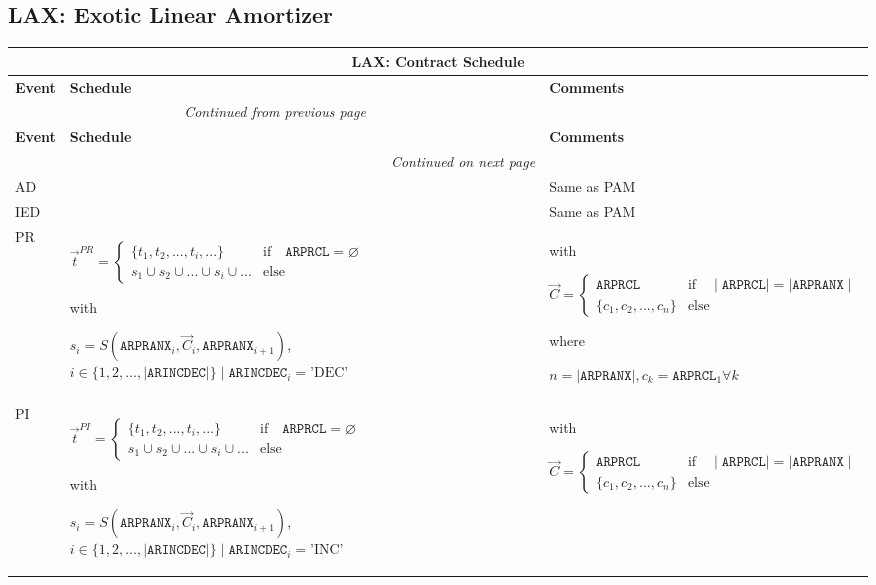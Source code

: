 \documentclass[9pt,oneside]{amsart}
\newenvironment{schedule}[1]{
	\hfill %
	\begin{longtable}{| p{0.05\textwidth} | p{0.5\textwidth} |  p{0.4\textwidth} |}
	\multicolumn{3}{c}{\textbf{#1: Contract Schedule}}\\
	\hline
	\textbf{Event} & \textbf{Schedule} & \textbf{Comments} \\
	\hline
	\endfirsthead
	\multicolumn{2}{c}{\textit{Continued from previous page}} \\
	\hline
	\textbf{Event} & \textbf{Schedule} & \textbf{Comments} \\
	\hline
	\endhead
	\hline \multicolumn{2}{r}{\textit{Continued on next page}} \\
	\endfoot
	\endlastfoot
}{%
	\hline
	\end{longtable}
}
\newcommand{\attr}[1]{\texttt{#1}}
\newcommand{\sdl}[3]{S(#1,#2,#3)}
\newcommand{\undef}{\varnothing}
\begin{document}

\subsection{LAX: Exotic Linear Amortizer}\label{sec:lax}


\begin{schedule}{LAX}
	AD & & Same as PAM \\
	\hline
	IED & & Same as PAM \\
	\hline
	PR & $\vec{t}^{PR} = \begin{cases} \{ t_1, t_2, ..., t_i, ... \} & \text{if}\quad \attr{ARPRCL}=\undef \\
					s_1 \cup s_2 \cup ... \cup s_i \cup ... & \text{else} \end{cases}$ \par
		with\par
		$s_i=\sdl{\attr{ARPRANX}_i}{\vec{C}_i}{\attr{ARPRANX}_{i+1}}$, $i\in\{1,2,...,\mid\attr{ARINCDEC}\mid\} \mid \attr{ARINCDEC}_i = \text{'DEC'}$
		& with\par $\vec{C} = \begin{cases} \attr{ARPRCL} & \text{if} \quad \mid\attr{ARPRCL}\mid = \mid \attr{ARPRANX}\mid \\
				   \{ c_1, c_2, ..., c_n \}  & \text{else} \end{cases}$ \par
			where\par
			$n=\mid\attr{ARPRANX}\mid, c_k=\attr{ARPRCL}_1\forall k$ \\
	\hline
	PI & $\vec{t}^{PI} = \begin{cases} \{ t_1, t_2, ..., t_i, ... \} & \text{if}\quad \attr{ARPRCL}=\undef \\
					s_1 \cup s_2 \cup ... \cup s_i \cup ... & \text{else} \end{cases}$ \par
		with\par
		$s_i=\sdl{\attr{ARPRANX}_i}{\vec{C}_i}{\attr{ARPRANX}_{i+1}}$, $i\in\{1,2,...,\mid\attr{ARINCDEC}\mid\} \mid \attr{ARINCDEC}_i = \text{'INC'}$
		& with\par $\vec{C} = \begin{cases} \attr{ARPRCL} & \text{if} \quad \mid\attr{ARPRCL}\mid = \mid \attr{ARPRANX}\mid \\
				   \{ c_1, c_2, ..., c_n \}  & \text{else} \end{cases}$ \par

\end{schedule}
\end{document}
